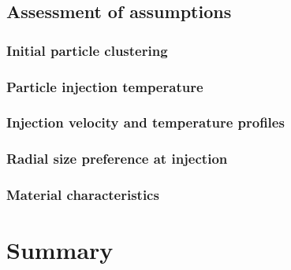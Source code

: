 \subsection{Assessment of assumptions}
\subsubsection{Initial particle clustering}
\subsubsection{Particle injection temperature}
\subsubsection{Injection velocity and temperature profiles}
\subsubsection{Radial size preference at injection}
\subsubsection{Material characteristics}
\section{Summary}
